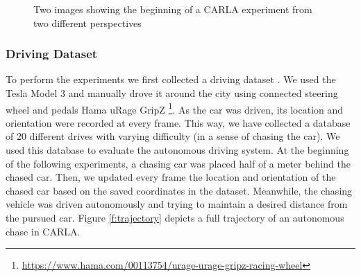\documentclass{ctuthesis/ctuthesis}
\begin{document}
\begin{figure}[]
    \centering
    \qquad
    \caption{Two images showing the beginning of a CARLA experiment from two different perspectives}%
    \label{fig:CARLA}%
\end{figure}




\subsubsection{Driving Dataset} \label{s:drivingDataset}
To perform the experiments we first collected a driving dataset \cite{my_github}. We used the Tesla Model 3 and manually drove it around the city using connected steering wheel and pedals Hama uRage GripZ \footnote{\href{https://www.hama.com/00113754/urage-urage-gripz-racing-wheel}{https://www.hama.com/00113754/urage-urage-gripz-racing-wheel}}. As the car was driven, its location and orientation were recorded at every frame. This way, we have collected a database of 20 different drives with varying difficulty (in a sense of chasing the car). We used this database to evaluate the autonomous driving system. At the beginning of the following experiments, a chasing car was placed half of a meter behind the chased car. Then, we updated every frame the location and orientation of the chased car based on the saved coordinates in the dataset. Meanwhile, the chasing vehicle was driven autonomously and trying to maintain a desired distance from the pursued car. Figure \ref{f:trajectory} depicts a full trajectory of an autonomous chase in CARLA.\par
\end{document}
